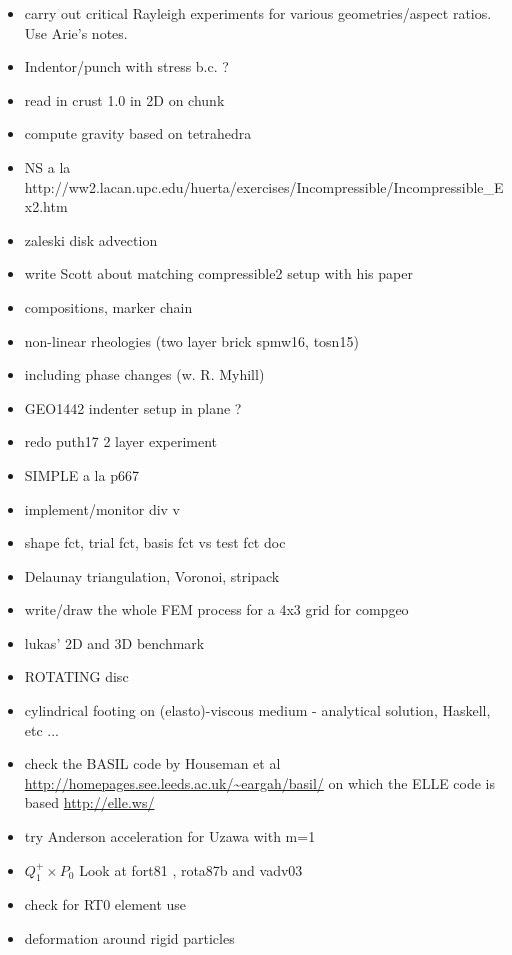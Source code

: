 \begin{itemize}
\item carry out critical Rayleigh experiments for various geometries/aspect ratios. Use Arie's notes. 
\item Indentor/punch with stress b.c. ?
\item read in crust 1.0 in 2D on chunk
\item compute gravity based on tetrahedra
\item NS a la http://ww2.lacan.upc.edu/huerta/exercises/Incompressible/Incompressible\_Ex2.htm
\item zaleski disk advection
\item write Scott about matching compressible2 setup with his paper
\item compositions, marker chain
\item non-linear rheologies (two layer brick spmw16, tosn15) 
\item including phase changes (w. R. Myhill)
\item GEO1442 indenter setup in plane ?
\item redo puth17 2 layer experiment
\item SIMPLE a la p667 \cite{john16} 
\item implement/monitor div v
\item shape fct, trial fct, basis fct vs test fct doc
\item Delaunay triangulation, Voronoi, stripack
\item write/draw the whole FEM process for a 4x3 grid for compgeo
\item lukas' 2D and 3D benchmark
\item ROTATING disc
\item cylindrical footing on (elasto)-viscous medium - analytical solution, Haskell, etc ...
\item check the BASIL code by Houseman et al \url{http://homepages.see.leeds.ac.uk/~eargah/basil/}
on which the ELLE code is based \url{http://elle.ws/} 
\item try Anderson acceleration for Uzawa \cite{hoow17} with m=1
\item $Q_1^+ \times P_0$ Look at fort81 , rota87b and vadv03
\item check \cite{bufm19} for RT0 element use
\item deformation around rigid particles \cite{ilma93}
\end{itemize}

